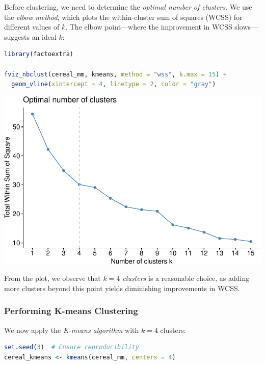\documentclass[
]{book}
\theoremstyle{definition}
\theoremstyle{definition}
\theoremstyle{definition}
\theoremstyle{definition}
\theoremstyle{remark}
\begin{document}
Before clustering, we need to determine the \emph{optimal number of clusters}. We use the \emph{elbow method}, which plots the within-cluster sum of squares (WCSS) for different values of \(k\). The elbow point---where the improvement in WCSS slows---suggests an ideal \(k\):

\begin{lstlisting}[language=R]
library(factoextra)

fviz_nbclust(cereal_mm, kmeans, method = "wss", k.max = 15) + 
  geom_vline(xintercept = 4, linetype = 2, color = "gray")
\end{lstlisting}

\begin{center}\includegraphics{clustering_files/figure-latex/unnamed-chunk-11-1} \end{center}

From the plot, we observe that \emph{\(k = 4\) clusters} is a reasonable choice, as adding more clusters beyond this point yields diminishing improvements in WCSS.

\subsubsection*{Performing K-means Clustering}\label{performing-k-means-clustering}

We now apply the \emph{K-means algorithm} with \(k = 4\) clusters:

\begin{lstlisting}[language=R]
set.seed(3)  # Ensure reproducibility
cereal_kmeans <- kmeans(cereal_mm, centers = 4)
\end{lstlisting}
\end{document}
